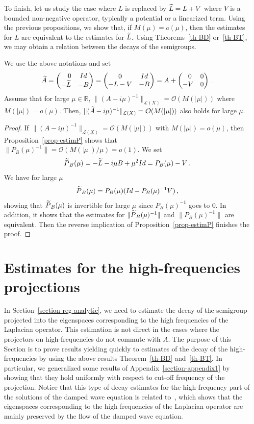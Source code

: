 \documentclass[AHL,Unicode,longabstracts]{cedram}
\newcommand{\RR}{\mathbb{R}}
\newcommand{\Lc}{\mathcal{L}}
\newcommand{\Oc}{\mathcal{O}}
\let\oldtilde\tilde
\renewcommand*{\tilde}[1]{\mathchoice{\widetilde{#1}}{\widetilde{#1}}{\oldtilde{#1}}{\oldtilde{#1}}}\let\oldexists\exists
\renewcommand*{\exists}{\mathrel{\oldexists}}
\begin{document}
To finish, let us study the case where $L$ is replaced by $\tilde L=L+V$ where $V$ is a bounded non-negative operator, typically a potential or a linearized term. Using the previous propositions, we show that, if $M(\mu)=o(\mu)$, then the estimates for $L$ are equivalent to the estimates for $\tilde L$. Using Theorems~\ref{th-BD} or~\ref{th-BT}, we may obtain a relation between the decays of the semigroups.

\begin{prop}\label{prop-appendix-linearized}
We use the above notations and set
\[
\tilde A=
\begin{pmatrix}
\quad 0 & Id \\ -\tilde L & -B
\end{pmatrix}=
\begin{pmatrix}
0 & Id \\ -L-V & -B
\end{pmatrix}=
A +\begin{pmatrix}
\;\;0 & 0 \\ -V & 0
\end{pmatrix}\,.
\]
Assume that for large $\mu\in\RR$, $\|(A-i\mu)^{-1}\|_{\Lc(X)} = \Oc (M(|\mu|))$ where $M(|\mu|)=o(\mu)$. Then, $\|(\tilde A-i\mu)^{-1}\|_{\Lc(X)} = \Oc (M(|\mu|))$ also holds for large $\mu$.
\end{prop}
\begin{proof}
If $\|(A-i\mu)^{-1}\|_{\Lc(X)} = \Oc (M(|\mu|))$ with $M(|\mu|)=o(\mu)$, then Proposition~\ref{prop-estimP} shows that $\|P_B(\mu)^{-1}\|=\Oc(M(|\mu|)/\mu)=o(1)$. We set
\[
\tilde P_B(\mu)= -\tilde L-i\mu B +\mu^2 Id = P_B(\mu)-V\,.
\]
We have for large $\mu$
\[
\tilde P_B(\mu)=P_B(\mu)(Id-P_B(\mu)^{-1} V)\,,
\]
showing that $\tilde P_B(\mu)$ is invertible for large $\mu$ since $P_B(\mu)^{-1}$ goes to $0$. In addition, it shows that the estimates for $\|\tilde P_B(\mu)^{-1}\|$ and $\|P_B(\mu)^{-1}\|$ are equivalent. Then the reverse implication of Proposition~\ref{prop-estimP} finishes the proof.
\end{proof}



\section{Estimates for the high-frequencies projections}\label{section-appendix2}
In Section~\ref{section-reg-analytic}, we need to estimate the decay of the semigroup projected into the eigenspaces corresponding to the high frequencies of the Laplacian operator. This estimation is not direct in the cases where the projectors on high-frequencies do not commute with $A$. The purpose of this Section is to prove results yielding quickly to estimates of the decay of the high-frequencies by using the above results Theorem~\ref{th-BD} and~\ref{th-BT}. In particular, we generalized some results of Appendix~\ref{section-appendix1} by showing that they hold uniformly with respect to cut-off frequency of the projection. Notice that this type of decay estimates for the high-frequency part of the solutions of the damped wave equation is related to~\cite[Theorem~10]{Burq-Lebeau}, which shows that the eigenspaces corresponding to the high frequencies of the Laplacian operator are mainly preserved by the flow of the damped wave equation.
\end{document}
